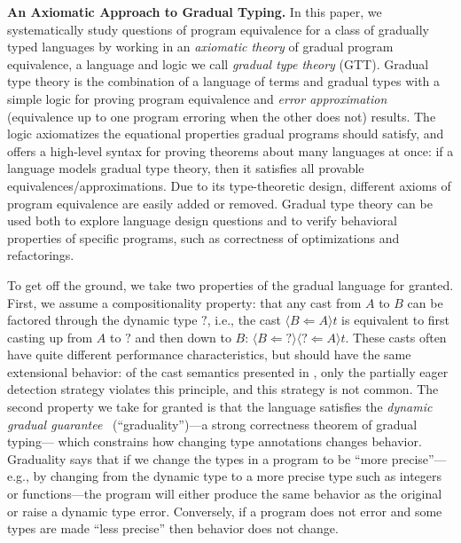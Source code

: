 \documentclass[acmsmall,nonacm]{acmart}
\newcommand{\dyn}{{?}}
\newcommand{\obcast}[2]{\langle{#1}\Leftarrow{#2}\rangle}
\begin{document}
\textbf{An Axiomatic Approach to Gradual Typing.}
In this paper, we systematically study questions of program equivalence
for a class of gradually typed languages by working in an
\emph{axiomatic theory} of gradual program equivalence, a language and
logic we call \emph{gradual type theory} (GTT). 
%
Gradual type theory is the combination of a language of terms and
gradual types with a simple logic for proving program equivalence and
\emph{error approximation} (equivalence up to one program erroring when
the other does not) results.
%
The logic axiomatizes the equational properties gradual
programs should satisfy, and offers a high-level syntax for proving
theorems about many languages at once:
if a language models gradual type theory, then it satisfies all
provable equivalences/approximations.
%
Due to its type-theoretic design, different axioms of program
equivalence are easily added or removed.
%
Gradual type theory can be used both to explore language design questions and
to verify behavioral properties of specific programs, such as correctness of
optimizations and refactorings.

To get off the ground, we take two properties of the gradual language
for granted.
%
First, we assume a compositionality property: that any cast from $A$
to $B$ can be factored through the dynamic type $\dyn$, i.e., the cast
$\obcast{B}{A}{t}$ is equivalent to first casting up from $A$ to
$\dyn$ and then down to $B$: $\obcast{B}{\dyn}\obcast{\dyn}{A} t$.
%
These casts often have quite different performance characteristics,
but should have the same extensional behavior: of the cast semantics
presented in \citet{siek+09designspace}, only the partially eager
detection strategy violates this principle, and this strategy is not
common.
%
The second property we take for granted is that the language satisfies
the \emph{dynamic gradual guarantee}~\cite{refined} (``graduality'')---a
strong correctness theorem of gradual typing--- which constrains how
changing type annotations changes behavior.  Graduality says that if we
change the types in a program to be ``more precise''---e.g., by changing
from the dynamic type to a more precise type such as integers or
functions---the program will either produce the same behavior as the
original or raise a dynamic type error.  Conversely, if a program does
not error and some types are made ``less precise'' then behavior does
not change.  

\end{document}
